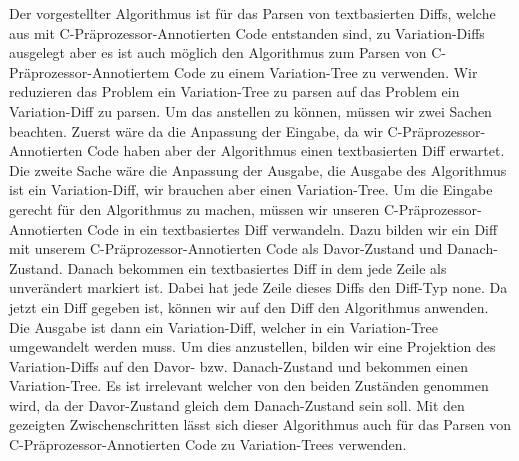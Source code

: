 Der vorgestellter Algorithmus ist für das Parsen von textbasierten Diffs, welche aus mit C-Präprozessor-Annotierten Code entstanden sind, zu Variation-Diffs ausgelegt aber es ist auch möglich den Algorithmus zum Parsen von C-Präprozessor-Annotiertem Code zu einem Variation-Tree zu verwenden. Wir reduzieren das Problem ein Variation-Tree zu parsen auf das Problem ein Variation-Diff zu parsen. Um das anstellen zu können, müssen wir zwei Sachen beachten. Zuerst wäre da die Anpassung der Eingabe, da wir C-Präprozessor-Annotierten Code haben aber der Algorithmus einen textbasierten Diff erwartet. Die zweite Sache wäre die Anpassung der Ausgabe, die Ausgabe des Algorithmus ist ein Variation-Diff, wir brauchen aber einen Variation-Tree. Um die Eingabe gerecht für den Algorithmus zu machen, müssen wir unseren C-Präprozessor-Annotierten Code in ein textbasiertes Diff verwandeln. Dazu bilden wir ein Diff mit unserem C-Präprozessor-Annotierten Code als Davor-Zustand und Danach-Zustand. Danach bekommen ein textbasiertes Diff in dem jede Zeile als unverändert markiert ist. Dabei hat jede Zeile dieses Diffs den Diff-Typ none. Da jetzt ein Diff gegeben ist, können wir auf den Diff den Algorithmus anwenden. Die Ausgabe ist dann ein Variation-Diff, welcher in ein Variation-Tree umgewandelt werden muss. Um dies anzustellen, bilden wir eine Projektion des Variation-Diffs auf den Davor- bzw. Danach-Zustand und bekommen einen Variation-Tree. Es ist irrelevant welcher von den beiden Zuständen genommen wird, da der Davor-Zustand gleich dem Danach-Zustand sein soll. Mit den gezeigten Zwischenschritten lässt sich dieser Algorithmus auch für das Parsen von C-Präprozessor-Annotierten Code zu Variation-Trees verwenden.\\


